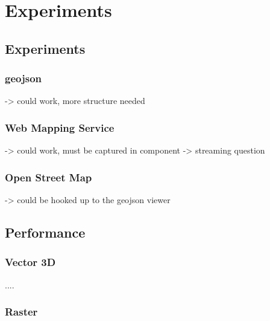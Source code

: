 \chapter{Experiments}%







\section{Experiments}

\subsection{ geojson }
-> could work, more structure needed

\subsection{ Web Mapping Service }
-> could work, must be captured in component
-> streaming question

\subsection{ Open Street Map }
-> could be hooked up to the geojson viewer



\section{ Performance }


\subsection{Vector 3D}

....

\subsection{Raster}

